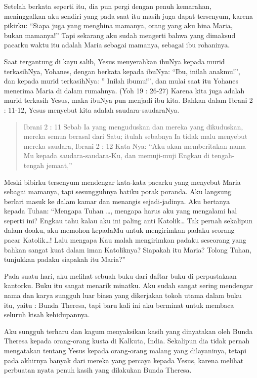 Setelah berkata seperti itu, dia pun pergi dengan penuh kemarahan, meninggalkan aku sendiri yang pada saat itu masih juga dapat tersenyum, karena pikirku:
“Siapa juga yang menghina mamanya, orang yang aku hina Maria, bukan mamanya!”
Tapi sekarang aku sudah mengerti bahwa yang dimaksud pacarku waktu itu adalah Maria sebagai mamanya, sebagai ibu rohaninya.

Saat tergantung di kayu salib, Yesus menyerahkan ibuNya kepada murid terkasihNya, Yohanes, dengan berkata kepada ibuNya: “Ibu, inilah anakmu!”, dan kepada murid terkasihNya: ” Inilah ibumu!”, dan mulai saat itu Yohanes menerima Maria di dalam rumahnya. (Yoh 19 : 26-27)
Karena kita juga adalah murid terkasih Yesus, maka ibuNya pun menjadi ibu kita. Bahkan dalam Ibrani 2 : 11-12, Yesus menyebut kita adalah saudara-saudaraNya.
\begin{quote}
Ibrani 2 : 11 Sebab Ia yang menguduskan dan mereka yang dikuduskan, mereka semua berasal dari Satu; itulah sebabnya Ia tidak malu menyebut mereka saudara,
Ibrani 2 : 12 Kata-Nya: “Aku akan memberitakan nama-Mu kepada saudara-saudara-Ku, dan memuji-muji Engkau di tengah-tengah jemaat,”
\end{quote}

Meski bibirku tersenyum mendengar kata-kata pacarku yang menyebut Maria sebagai mamanya, tapi sesungguhnya hatiku porak poranda. Aku langsung berlari masuk ke dalam kamar dan menangis sejadi-jadinya.
Aku bertanya kepada Tuhan:
“Mengapa Tuhan \ldots , mengapa harus aku yang mengalami hal seperti ini? Engkau tahu kalau aku ini paling anti Katolik… Tak pernah sekalipun dalam doaku, aku memohon kepadaMu untuk mengirimkan padaku seorang pacar Katolik…! Lalu mengapa Kau malah mengirimkan padaku seseorang yang bahkan sangat kuat dalam iman Katoliknya? Siapakah itu Maria? Tolong Tuhan, tunjukkan padaku siapakah itu Maria?”

Pada suatu hari, aku melihat sebuah buku dari daftar buku di perpustakaan kantorku. Buku itu sangat menarik minatku. Aku sudah sangat sering mendengar nama dan karya sungguh luar biasa yang dikerjakan tokoh utama dalam buku itu, yaitu : Bunda Theresa, tapi baru kali ini aku berminat untuk membaca seluruh kisah kehidupannya.

Aku sungguh terharu dan kagum menyaksikan kasih yang dinyatakan oleh Bunda Theresa kepada orang-orang kusta di Kalkuta, India. Sekalipun dia tidak pernah mengatakan tentang Yesus kepada orang-orang malang yang dilayaninya, tetapi pada akhirnya banyak dari mereka yang percaya kepada Yesus, karena melihat perbuatan nyata penuh kasih yang dilakukan Bunda Theresa.

